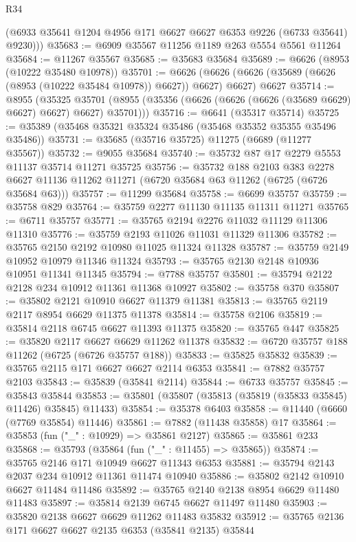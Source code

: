 \begin{lexlean}{R34}
\begin{coremodule}
        (@6933 @35641 @1204 @4956 @171 @6627 @6627 @6353 @9226 (@6733 @35641) @9230)))
@35683 := @6909 @35567 @11256 @1189 @263 @5554 @5561 @11264
@35684 := @11267 @35567
@35685 := @35683 @35684
@35689 := @6626 (@8953 (@10222 @35480 @10978))
@35701 := @6626
    (@6626 (@6626 (@35689 (@6626 (@8953 (@10222 @35484 @10978)) @6627)) @6627) @6627)
    @6627
@35714 := @8955
    (@35325 @35701 (@8955 (@35356 (@6626 (@6626 (@6626 (@35689 @6629) @6627) @6627) @6627) @35701)))
@35716 := @6641 (@35317 @35714)
@35725 := @35389 (@35468 @35321 @35324 @35486 (@35468 @35352 @35355 @35496 @35486))
@35731 := @35685 (@35716 @35725) @11275 (@6689 (@11277 @35567))
@35732 := @9055 @35684
@35740 := @35732 @87 @17 @2279 @5553 @11137 @35714 @11271 @35725
@35756 := @35732
    @188
    @2103
    @383
    @2278
    @6627
    @11136
    @11262
    @11271
    (@6720 @35684 @63 @11262 (@6725 (@6726 @35684 @63)))
@35757 := @11299 @35684
@35758 := @6699 @35757
@35759 := @35758 @829
@35764 := @35759 @2277 @11130 @11135 @11311 @11271
@35765 := @6711 @35757
@35771 := @35765 @2194 @2276 @11032 @11129 @11306 @11310
@35776 := @35759 @2193 @11026 @11031 @11329 @11306
@35782 := @35765 @2150 @2192 @10980 @11025 @11324 @11328
@35787 := @35759 @2149 @10952 @10979 @11346 @11324
@35793 := @35765 @2130 @2148 @10936 @10951 @11341 @11345
@35794 := @7788 @35757
@35801 := @35794 @2122 @2128 @234 @10912 @11361 @11368 @10927
@35802 := @35758 @370
@35807 := @35802 @2121 @10910 @6627 @11379 @11381
@35813 := @35765 @2119 @2117 @8954 @6629 @11375 @11378
@35814 := @35758 @2106
@35819 := @35814 @2118 @6745 @6627 @11393 @11375
@35820 := @35765 @447
@35825 := @35820 @2117 @6627 @6629 @11262 @11378
@35832 := @6720 @35757 @188 @11262 (@6725 (@6726 @35757 @188))
@35833 := @35825 @35832
@35839 := @35765 @2115 @171 @6627 @6627 @2114 @6353
@35841 := @7882 @35757 @2103
@35843 := @35839 (@35841 @2114)
@35844 := @6733 @35757
@35845 := @35843 @35844
@35853 := @35801 (@35807 (@35813 (@35819 (@35833 @35845) @11426) @35845) @11433)
@35854 := @35378 @6403
@35858 := @11440 (@6660 (@7769 @35854) @11446)
@35861 := @7882 (@11438 @35858) @17
@35864 := @35853 (fun ("_" : @10929) => @35861 @2127)
@35865 := @35861 @233
@35868 := @35793 (@35864 (fun ("_" : @11455) => @35865))
@35874 := @35765 @2146 @171 @10949 @6627 @11343 @6353
@35881 := @35794 @2143 @2037 @234 @10912 @11361 @11474 @10940
@35886 := @35802 @2142 @10910 @6627 @11484 @11486
@35892 := @35765 @2140 @2138 @8954 @6629 @11480 @11483
@35897 := @35814 @2139 @6745 @6627 @11497 @11480
@35903 := @35820 @2138 @6627 @6629 @11262 @11483 @35832
@35912 := @35765 @2136 @171 @6627 @6627 @2135 @6353 (@35841 @2135) @35844

\end{coremodule}
\end{lexlean}
